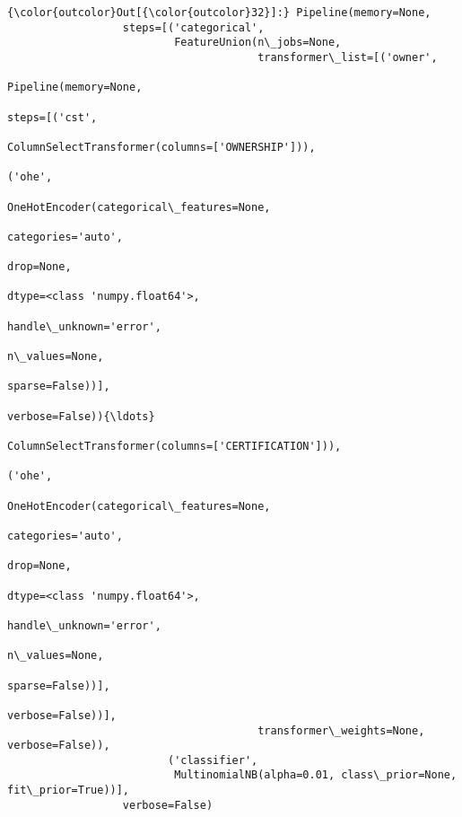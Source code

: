 \documentclass[11pt]{article}
\begin{document}
\begin{Verbatim}[commandchars=\\\{\}]
{\color{outcolor}Out[{\color{outcolor}32}]:} Pipeline(memory=None,
                  steps=[('categorical',
                          FeatureUnion(n\_jobs=None,
                                       transformer\_list=[('owner',
                                                          Pipeline(memory=None,
                                                                   steps=[('cst',
                                                                           ColumnSelectTransformer(columns=['OWNERSHIP'])),
                                                                          ('ohe',
                                                                           OneHotEncoder(categorical\_features=None,
                                                                                         categories='auto',
                                                                                         drop=None,
                                                                                         dtype=<class 'numpy.float64'>,
                                                                                         handle\_unknown='error',
                                                                                         n\_values=None,
                                                                                         sparse=False))],
                                                                   verbose=False)){\ldots}
                                                                           ColumnSelectTransformer(columns=['CERTIFICATION'])),
                                                                          ('ohe',
                                                                           OneHotEncoder(categorical\_features=None,
                                                                                         categories='auto',
                                                                                         drop=None,
                                                                                         dtype=<class 'numpy.float64'>,
                                                                                         handle\_unknown='error',
                                                                                         n\_values=None,
                                                                                         sparse=False))],
                                                                   verbose=False))],
                                       transformer\_weights=None, verbose=False)),
                         ('classifier',
                          MultinomialNB(alpha=0.01, class\_prior=None, fit\_prior=True))],
                  verbose=False)
\end{Verbatim}
            
\end{document}
